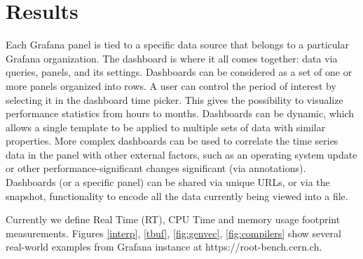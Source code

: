 \documentclass{webofc}
\begin{document}



\section{Results} \label{sec:results}

Each Grafana panel is tied to a specific data source that belongs to a particular Grafana organization.  The dashboard is where it all comes together: data via queries, panels, and its settings. Dashboards can be considered as a set of one or more panels organized into rows. A user can control the period of interest by selecting it in the dashboard time picker. This gives the possibility to visualize performance statistics from hours to months. Dashboards can be dynamic, which allows a single template to be applied to multiple sets of data with similar properties. More complex dashboards can be used to correlate the time series data in the panel with other external factors, such as an operating system update or other performance-significant changes significant (via annotations). Dashboards (or a specific panel) can be shared via unique URLs, or via the snapshot, functionality to encode all the data currently being viewed into a file.

Currently we define Real Time (RT), CPU Time and  memory usage footprint measurements. Figures \ref{interp}, \ref{tbuf}, \ref{fig:genvec}, \ref{fig:compilers} show several real-world examples from Grafana instance at https://root-bench.cern.ch.
\end{document}
